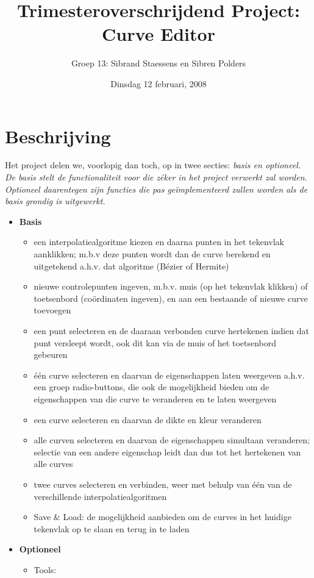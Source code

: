 \documentclass[a4paper,11pt,oneside, titlepage]{article}
\author{Groep 13: Sibrand Staessens en Sibren Polders}
\title{Trimesteroverschrijdend Project: Curve Editor}
\date{Dinsdag 12 februari, 2008}
\begin{document}
\maketitle \newpage
\section{Beschrijving}
Het project delen we, voorlopig dan toch, op in twee secties: \it{basis} \rm{en} \it{optioneel}. \rm{De} \it{basis} \rm{stelt de functionaliteit voor die z\'eker in het project verwerkt zal worden.}\it{ Optioneel}\rm{ daarentegen zijn functies die pas ge\"implementeerd zullen worden als de basis grondig is uitgewerkt.}
\begin{itemize}
\item \bf{Basis}
\begin{itemize}
\item \rm{een interpolatiealgoritme kiezen en daarna punten in het tekenvlak aanklikken; m.b.v deze punten wordt dan de curve berekend en uitgetekend a.h.v. dat algoritme (B\'ezier of Hermite)}
\item \rm{nieuwe controlepunten ingeven, m.b.v. muis (op het tekenvlak klikken) of toetsenbord (co\"ordinaten ingeven), en aan een bestaande of nieuwe curve toevoegen}
\item een punt selecteren en de daaraan verbonden curve hertekenen indien dat punt versleept wordt, ook dit kan via de muis of het toetsenbord gebeuren
\item \'e\'en curve selecteren en daarvan de eigenschappen laten weergeven a.h.v. een groep radio-buttons, die ook de mogelijkheid bieden om de eigenschappen van die curve te veranderen en te laten weergeven
\item een curve selecteren en daarvan de dikte en kleur veranderen
\item alle curven selecteren en daarvan de eigenschappen simultaan veranderen; selectie van een andere eigenschap leidt dan dus tot het hertekenen van alle curves
\item twee curves selecteren en verbinden, weer met behulp van \'e\'en van de verschillende interpolatiealgoritmen
\item Save \& Load: de mogelijkheid aanbieden om de curves in het huidige tekenvlak op te slaan en terug in te laden
\end{itemize}
\item \bf{Optioneel}
\begin{itemize}
\item \rm{Tools:}
\begin{itemize}

\end{itemize}
\end{itemize}
\end{itemize}
\end{document}
